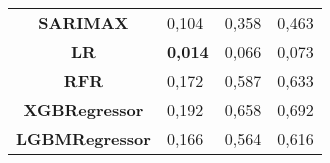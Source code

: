 \begin{table}[H]
\begin{tabular}{@{}clll@{}}
\textbf{SARIMAX}                  & 0,104                             & 0,358                            & 0,463                             \\
\textbf{LR}                       & \textbf{0,014}                             & 0,066                            & 0,073                             \\
\textbf{RFR}                      & 0,172                             & 0,587                            & 0,633                             \\
\textbf{XGBRegressor}             & 0,192                             & 0,658                            & 0,692                             \\
\textbf{LGBMRegressor}            & 0,166                             & 0,564                            & 0,616                             \\ \bottomrule
	\end{tabular}

\end{table}

